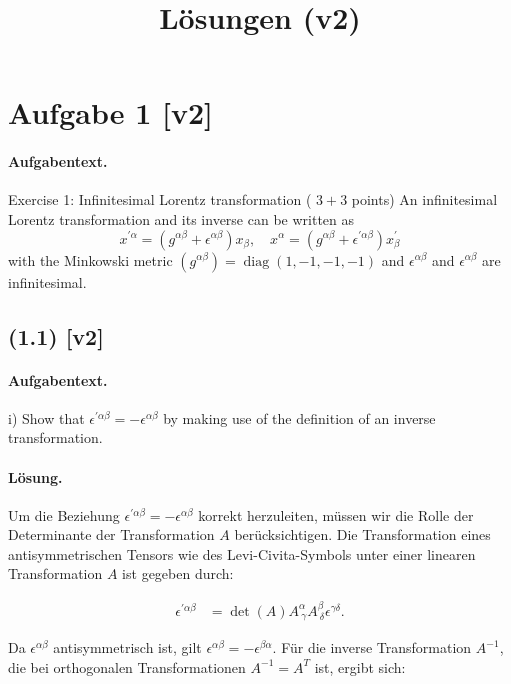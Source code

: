 \documentclass[11pt,a4paper]{article}
\title{Lösungen (v2)}
\date{}
\begin{document}
\maketitle

\section*{Aufgabe 1 [v2]}
\paragraph{Aufgabentext.}
Exercise 1: Infinitesimal Lorentz transformation ( $3+3$ points)
An infinitesimal Lorentz transformation and its inverse can be written as
$$
x^{\prime \alpha}=\left(g^{\alpha \beta}+\epsilon^{\alpha \beta}\right) x_\beta, \quad x^\alpha=\left(g^{\alpha \beta}+\epsilon^{\prime \alpha \beta}\right) x_\beta^{\prime}
$$
with the Minkowski metric $\left(g^{\alpha \beta}\right)=\operatorname{diag}(1,-1,-1,-1)$ and $\epsilon^{\alpha \beta}$ and $\epsilon^{\alpha \beta}$ are infinitesimal.

\subsection*{(1.1) [v2]}
\paragraph{Aufgabentext.}
i) Show that $\epsilon^{\prime \alpha \beta}=-\epsilon^{\alpha \beta}$ by making use of the definition of an inverse transformation.

\paragraph{Lösung.}
Um die Beziehung $\epsilon^{\prime \alpha \beta} = -\epsilon^{\alpha \beta}$ korrekt herzuleiten, müssen wir die Rolle der Determinante der Transformation $A$ berücksichtigen. Die Transformation eines antisymmetrischen Tensors wie des Levi-Civita-Symbols unter einer linearen Transformation $A$ ist gegeben durch:

\begin{align*}
\epsilon^{\prime \alpha \beta} &= \det(A) A^\alpha_{\ \gamma} A^\beta_{\ \delta} \epsilon^{\gamma \delta}.
\end{align*}

Da $\epsilon^{\alpha \beta}$ antisymmetrisch ist, gilt $\epsilon^{\alpha \beta} = -\epsilon^{\beta \alpha}$. Für die inverse Transformation $A^{-1}$, die bei orthogonalen Transformationen $A^{-1} = A^T$ ist, ergibt sich:
\end{document}
